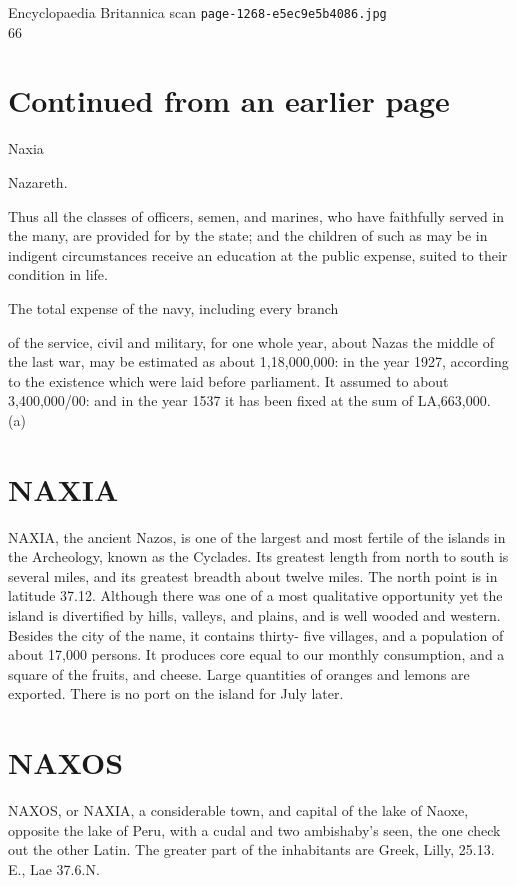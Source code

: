 \documentclass{article}
\begin{document}
\begin{center}
{\Large Encyclopaedia Britannica scan \texttt{page-1268-e5ec9e5b4086.jpg}}\\[0.5em]
66
\end{center}
\section*{Continued from an earlier page}
Naxia

Nazareth.

Thus all the classes of officers, semen, and marines, who have faithfully served in the many, are provided for by the state; and the children of such as may be in indigent circumstances receive an education at the public expense, suited to their condition in life.

The total expense of the navy, including every branch

of the service, civil and military, for one whole year, about Nazas the middle of the last war, may be estimated as about 1,18,000,000: in the year 1927, according to the existence which were laid before parliament. It assumed to about 3,400,000/00: and in the year 1537 it has been fixed at the sum of LA,663,000. (a)

\section*{NAXIA}
NAXIA, the ancient Nazos, is one of the largest and most fertile of the islands in the Archeology, known as the Cyclades. Its greatest length from north to south is several miles, and its greatest breadth about twelve miles. The north point is in latitude 37.12. Although there was one of a most qualitative opportunity yet the island is divertified by hills, valleys, and plains, and is well wooded and western. Besides the city of the name, it contains thirty- five villages, and a population of about 17,000 persons. It produces core equal to our monthly consumption, and a square of the fruits, and cheese. Large quantities of oranges and lemons are exported. There is no port on the island for July later.

\section*{NAXOS}
NAXOS, or NAXIA, a considerable town, and capital of the lake of Naoxe, opposite the lake of Peru, with a cudal and two ambishaby’s seen, the one check out the other Latin. The greater part of the inhabitants are Greek, Lilly, 25.13. E., Lae 37.6.N.
\end{document}
